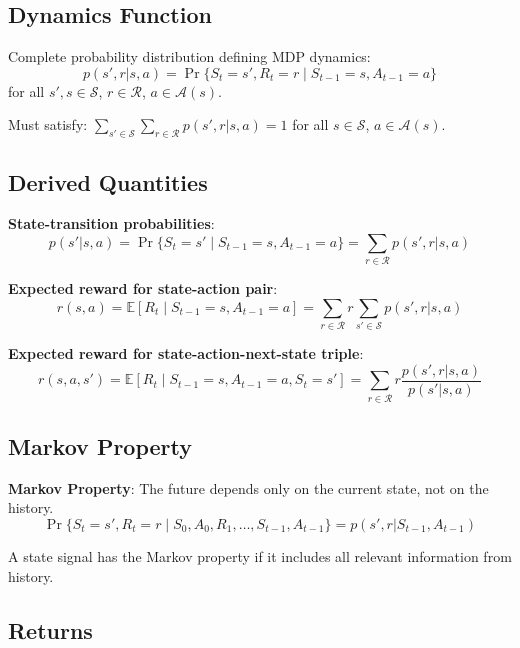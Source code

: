 \documentclass[10pt]{article}
\begin{document}
\subsection{Dynamics Function}
Complete probability distribution defining MDP dynamics:
\begin{equation}
p(s',r|s,a) = \Pr\{S_t=s', R_t=r \mid S_{t-1}=s, A_{t-1}=a\}
\end{equation}
for all $s', s \in \mathcal{S}$, $r \in \mathcal{R}$, $a \in \mathcal{A}(s)$.

Must satisfy: $\sum_{s' \in \mathcal{S}} \sum_{r \in \mathcal{R}} p(s',r|s,a) = 1$ for all $s \in \mathcal{S}$, $a \in \mathcal{A}(s)$.

\subsection{Derived Quantities}

\textbf{State-transition probabilities}:
\begin{equation}
p(s'|s,a) = \Pr\{S_t=s' \mid S_{t-1}=s, A_{t-1}=a\} = \sum_{r \in \mathcal{R}} p(s',r|s,a)
\end{equation}

\textbf{Expected reward for state-action pair}:
\begin{equation}
r(s,a) = \mathbb{E}[R_t \mid S_{t-1}=s, A_{t-1}=a] = \sum_{r \in \mathcal{R}} r \sum_{s' \in \mathcal{S}} p(s',r|s,a)
\end{equation}

\textbf{Expected reward for state-action-next-state triple}:
\begin{equation}
r(s,a,s') = \mathbb{E}[R_t \mid S_{t-1}=s, A_{t-1}=a, S_t=s'] = \sum_{r \in \mathcal{R}} r \frac{p(s',r|s,a)}{p(s'|s,a)}
\end{equation}

\subsection{Markov Property}
\textbf{Markov Property}: The future depends only on the current state, not on the history.
\begin{equation}
\Pr\{S_t=s', R_t=r \mid S_0, A_0, R_1, \ldots, S_{t-1}, A_{t-1}\} = p(s',r|S_{t-1}, A_{t-1})
\end{equation}

A state signal has the Markov property if it includes all relevant information from history.

\subsection{Returns}
\end{document}
